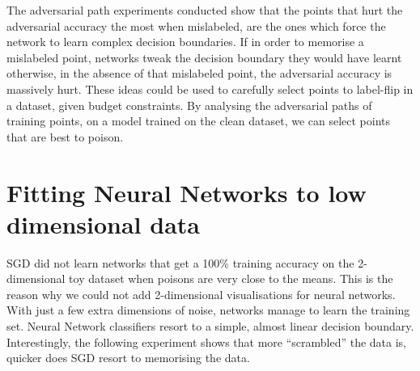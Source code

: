 \documentclass{ociamthesis}
\begin{document}
The adversarial path experiments conducted show that the points that hurt the
adversarial accuracy the most when mislabeled, are the ones which force the
network to learn complex decision boundaries. If in order to memorise a
mislabeled point, networks tweak the decision boundary they would have learnt
otherwise, in the absence of that mislabeled point, the adversarial accuracy is
massively hurt. These ideas could be used to carefully select points to
label-flip in a dataset, given budget constraints. By analysing the adversarial
paths of training points, on a model trained on the clean dataset, we can select
points that are best to poison.


\clearpage



\begin{appendices}
    
\end{appendices}
\section{Fitting Neural Networks to low dimensional data}

SGD did not learn networks that get a 100\% training accuracy on the
2-dimensional toy dataset when poisons are very close to the means. This is the
reason why we could not add 2-dimensional visualisations for neural networks.
With just a few extra dimensions of noise, networks manage to learn the training
set. Neural Network classifiers resort to a simple, almost linear decision
boundary. Interestingly, the following experiment shows that more ``scrambled''
the data is, quicker does SGD resort to memorising the data.
\end{document}
